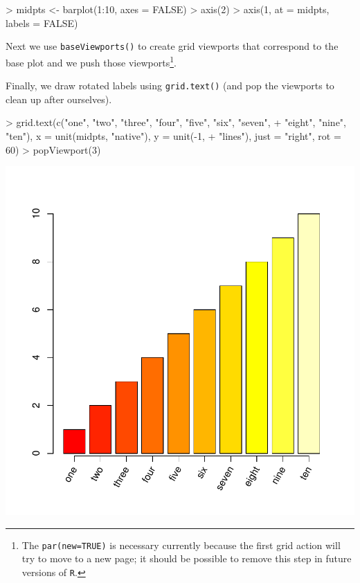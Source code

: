 \documentclass[a4paper]{article}
\newcommand{\R}{{\tt R}}
\begin{document}
\begin{Schunk}
\begin{Sinput}
> midpts <- barplot(1:10, axes = FALSE)
> axis(2)
> axis(1, at = midpts, labels = FALSE)
\end{Sinput}
\end{Schunk}
Next we  use \verb|baseViewports()| to 
create grid viewports that correspond to the base plot and we push
those viewports\footnote{The {\tt par(new=TRUE)}
is necessary currently because the first grid action will
try to move to a new page;  it should be possible to remove
this step in future versions of \R{}.}.

\begin{Schunk}
\end{Schunk}
Finally, we draw rotated labels using 
\verb|grid.text()| (and pop the viewports to clean up after ourselves).

\begin{Schunk}
\begin{Sinput}
> grid.text(c("one", "two", "three", "four", "five", "six", "seven", 
+     "eight", "nine", "ten"), x = unit(midpts, "native"), y = unit(-1, 
+     "lines"), just = "right", rot = 60)
> popViewport(3)
\end{Sinput}
\end{Schunk}
\includegraphics{gridBase-005}
\end{document}

